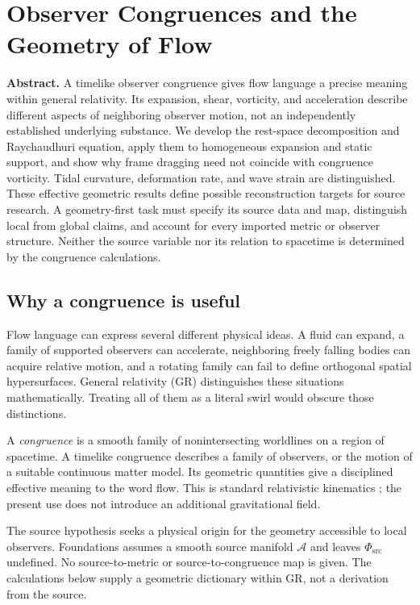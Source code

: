 \documentclass[11pt,oneside]{report}
\newcommand{\Sub}{\mathcal A}
\newcommand{\PhiSrc}{\Phi_{\mathrm{src}}}
\theoremstyle{remark}
\numberwithin{definition}{chapter}
\numberwithin{proposition}{chapter}
\numberwithin{remark}{chapter}
\newcommand{\ChapterAbstract}[1]{%
  \begingroup
  \setlength{\parindent}{0pt}%
  \small\textbf{Abstract.} #1\par
  \endgroup
  \vspace{0.55\baselineskip}%
}
\begin{document}
\chapter{Observer Congruences and the Geometry of Flow}
\label{chapter:geometry}
\ChapterAbstract{A timelike observer congruence gives flow language a precise meaning within general relativity. Its expansion, shear, vorticity, and acceleration describe different aspects of neighboring observer motion, not an independently established underlying substance. We develop the rest-space decomposition and Raychaudhuri equation, apply them to homogeneous expansion and static support, and show why frame dragging need not coincide with congruence vorticity. Tidal curvature, deformation rate, and wave strain are distinguished. These effective geometric results define possible reconstruction targets for source research. A geometry-first task must specify its source data and map, distinguish local from global claims, and account for every imported metric or observer structure. Neither the source variable nor its relation to spacetime is determined by the congruence calculations.}

\section{Why a congruence is useful}
Flow language can express several different physical ideas. A fluid can expand, a family of supported observers can accelerate, neighboring freely falling bodies can acquire relative motion, and a rotating family can fail to define orthogonal spatial hypersurfaces. General relativity (GR) distinguishes these situations mathematically. Treating all of them as a literal swirl would obscure those distinctions.

A \emph{congruence} is a smooth family of nonintersecting worldlines on a region of spacetime. A timelike congruence describes a family of observers, or the motion of a suitable continuous matter model. Its geometric quantities give a disciplined effective meaning to the word flow. This is standard relativistic kinematics \parencite{Raychaudhuri1955,EllisVanElst1999}; the present use does not introduce an additional gravitational field.

The source hypothesis seeks a physical origin for the geometry accessible to local observers. Foundations assumes a smooth source manifold $\Sub$ and leaves $\PhiSrc$ undefined. No source-to-metric or source-to-congruence map is given. The calculations below supply a geometric dictionary within GR, not a derivation from the source.
\end{document}
